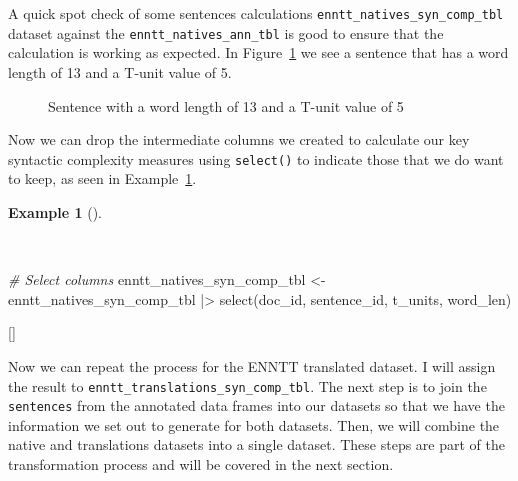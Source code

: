 \documentclass[
  letterpaper,
  krantz1]{latex/krantz-mod}
\newenvironment{Shaded}{\begin{snugshade}}{\end{snugshade}}
\newcommand{\CommentTok}[1]{\textcolor[rgb]{0.00,0.00,0.00}{\textit{#1}}}
\newcommand{\FunctionTok}[1]{\textcolor[rgb]{0.00,0.00,0.00}{#1}}
\newcommand{\NormalTok}[1]{\textcolor[rgb]{0.00,0.00,0.00}{#1}}
\newcommand{\OtherTok}[1]{\textcolor[rgb]{0.00,0.00,0.00}{#1}}
\newcommand{\SpecialCharTok}[1]{\textcolor[rgb]{0.00,0.00,0.00}{#1}}
\newcommand{\cindex}[1]{%
  \StrSubstitute{#1}{_}{\_}[\temp]%
  \index{\temp}%
}
\theoremstyle{definition}
\theoremstyle{definition}
\newtheorem{example}{Example}[chapter]
\theoremstyle{remark}
\begin{document}
A quick spot check of some sentences calculations
\texttt{enntt\_natives\_syn\_comp\_tbl} dataset against the
\texttt{enntt\_natives\_ann\_tbl} is good to ensure that the calculation
is working as expected. In
Figure~\ref{fig-transform-generation-udpipe-natives-tunits} we see a
sentence that has a word length of 13 and a T-unit value of 5.

\begin{figure}[!htb]


\caption{\label{fig-transform-generation-udpipe-natives-tunits}Sentence
with a word length of 13 and a T-unit value of 5}

\end{figure}%

Now we can drop the intermediate columns we created to calculate our key
syntactic complexity measures using \texttt{select()} to indicate those
that we do want to keep, as seen in
Example~\ref{exm-transform-generation-udpipe-natives-tunits-words-select}.

\pagebreak

\begin{example}[]\protect\hypertarget{exm-transform-generation-udpipe-natives-tunits-words-select}{}\label{exm-transform-generation-udpipe-natives-tunits-words-select}

~

\begin{Shaded}
\begin{Highlighting}[numbers=left,,]
\CommentTok{\# Select columns}
\NormalTok{enntt\_natives\_syn\_comp\_tbl }\OtherTok{\textless{}{-}}
\NormalTok{  enntt\_natives\_syn\_comp\_tbl }\SpecialCharTok{|\textgreater{}}
  \FunctionTok{select}\NormalTok{(doc\_id, sentence\_id, t\_units, word\_len)}
\end{Highlighting}
\end{Shaded}

\cindex{select()}

\end{example}

Now we can repeat the process for the ENNTT translated dataset. I will
assign the result to \texttt{enntt\_translations\_syn\_comp\_tbl}. The
next step is to join the \texttt{sentences} from the annotated data
frames into our datasets so that we have the information we set out to
generate for both datasets. Then, we will combine the native and
translations datasets into a single dataset. These steps are part of the
transformation process and will be covered in the next section.
\end{document}
